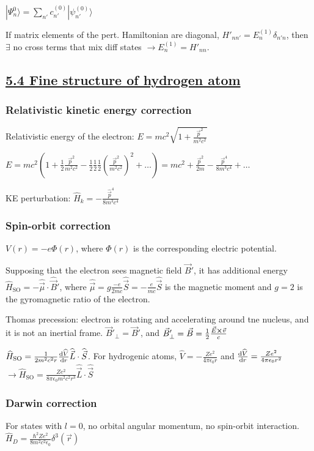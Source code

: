 $|\Psi_n^0 \rangle = \sum_{n'} c_{n'}^{(0)} | \psi_{n'}^{(0)} \rangle$

If matrix elements of the pert. Hamiltonian are diagonal, $H'_{nn'} = E_n^{(1)} \delta_{n'n}$, then $\exists$ no cross terms that mix diff states $\rightarrow E_n^{(1)} = H'_{nn}$.

\subsection{\underline{5.4 Fine structure of hydrogen atom}}

\subsubsection{Relativistic kinetic energy correction}

Relativistic energy of the electron: $E = mc^2 \sqrt{1 + \frac{\vec{p}^2}{m^2 c^2}}$

$E = mc^2(1 + \frac{1}{2} \frac{\vec{p}^2}{m^2 c^2} - \frac{1}{2}\frac{1}{2}\frac{1}{2} (\frac{\vec{p}^2}{m^2 c^2})^2 + \dots) = mc^2 + \frac{\vec{p}^2}{2m} - \frac{\vec{p}^4}{8m^3c^4} + \dots$

KE perturbation: $\widehat{H}_k = -\frac{\widehat{\vec{p}}^4}{8 m^3 c^4}$

\subsubsection{Spin-orbit correction}

$V(r) = -e \Phi(r)$, where $\Phi(r)$ is the corresponding electric potential.

Supposing that the electron sees magnetic field $\vec{B}'$, it has additional energy $\widehat{H}_{\textrm{SO}} = - \widehat{\vec{\mu}} \cdot \widehat{\vec{B}}'$, where $\widehat{\vec{\mu}} = g \frac{-e}{2mc} \widehat{\vec{S}} = - \frac{e}{mc} \widehat{\vec{S}}$ is the magnetic moment and $g=2$ is the gyromagnetic ratio of the electron.

Thomas precession: electron is rotating and accelerating around tne nucleus, and it is not an inertial frame. $\vec{B}'_{\perp} = \vec{B}'$, and $\vec{B}'_{\perp} = \vec{B} = \frac{1}{2} \frac{\vec{E} \cross \vec{v}}{c}$

$\widehat{H}_{\textrm{SO}} = \frac{1}{2m^2c^2 r} \dv{\widehat{V}}{r} \widehat{\vec{L}} \cdot \widehat{\vec{S}}$. For hydrogenic atoms, $\widehat{V} = -\frac{Ze^2}{4 \pi \epsilon_0 r}$ and $\dv{\widehat{V}}{r} = \frac{Ze^2}{4 \pi \epsilon_0 r^2}$
$\rightarrow \widehat{H}_{\textrm{SO}} = \frac{Ze^2}{8 \pi \epsilon_0 m^2 c^2 r^3} \widehat{\vec{L}} \cdot \widehat{\vec{S}}$

\subsubsection{Darwin correction}

For states with $l=0$, no orbital angular momentum, no spin-orbit interaction.
$\widehat{H}_D = \frac{\hbar^2 Z e^2}{8 m^2 c^2 \epsilon_0} \delta^3 (\vec{r})$

